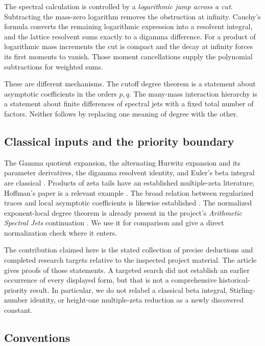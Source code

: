 The spectral calculation is controlled by a \emph{logarithmic jump across
a cut}. Subtracting the mass-zero logarithm removes the obstruction at
infinity. Cauchy's formula converts the remaining logarithmic expression
into a resolvent integral, and the lattice resolvent sums exactly to a
digamma difference. For a product of logarithmic mass increments the cut
is compact and the decay at infinity forces its first moments to vanish.
Those moment cancellations supply the polynomial subtractions for weighted
sums.

These are different mechanisms. The cutoff degree theorem is a statement
about asymptotic coefficients in the orders \(p,q\). The many-mass
interaction hierarchy is a statement about finite differences of spectral
jets with a fixed total number of factors. Neither follows by replacing
one meaning of degree with the other.

\subsection{Classical inputs and the priority boundary}

The Gamma quotient expansion, the alternating Hurwitz expansion and its
parameter derivatives, the digamma resolvent identity, and Euler's beta
integral are classical
\cite{DLMF,HuKim,WangHuKim}. Products of zeta tails have an established
multiple-zeta literature; Hoffman's paper is a relevant example
\cite{Hoffman}. The broad relation between regularized traces and local
asymptotic coefficients is likewise established
\cite{PaychaScott}. The normalized exponent-local degree theorem is already
present in the project's \emph{Arithmetic Spectral Jets} continuation
\cite{ProveItArithmeticJets}. We use it for comparison and give a direct
normalization check where it enters.

The contribution claimed here is the stated collection of precise
deductions and completed research targets relative to the inspected
project material. The article gives proofs of those statements. A targeted
search did not establish an earlier occurrence of every displayed form,
but that is not a comprehensive historical-priority result. In particular,
we do not relabel a classical beta integral, Stirling-number identity, or
height-one multiple-zeta reduction as a newly discovered constant.

\subsection{Conventions}

